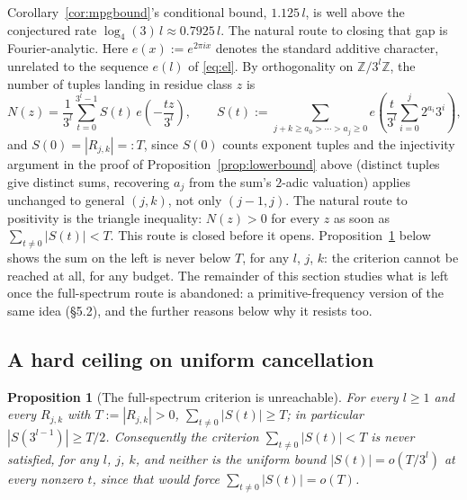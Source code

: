 \documentclass[11pt]{amsart}
\theoremstyle{plain}
\newtheorem{proposition}[theorem]{Proposition}
\theoremstyle{definition}
\theoremstyle{remark}
\newcommand{\Z}{\mathbb{Z}}
\begin{document}
Corollary~\ref{cor:mpgbound}'s conditional bound, $1.125\,l$, is well above the conjectured rate
$\log_4(3)\,l \approx 0.7925\,l$. The natural route to closing that gap is Fourier-analytic. Here
$e(x):=e^{2\pi ix}$ denotes the standard additive character, unrelated to the sequence $e(l)$ of
\eqref{eq:el}. By orthogonality on $\Z/3^l\Z$, the number of tuples landing in
residue class $z$ is
\begin{equation}
\label{eq:Nz}
N(z) = \frac1{3^l}\sum_{t=0}^{3^l-1} S(t)\,e\!\left(-\frac{tz}{3^l}\right), \qquad
S(t) := \sum_{j+k\ge a_0>\cdots>a_j\ge0} e\!\left(\frac{t}{3^l}\sum_{i=0}^j 2^{a_i}3^i\right),
\end{equation}
and $S(0)=|R_{j,k}|=:T$, since $S(0)$ counts exponent tuples and the injectivity argument in the
proof of Proposition~\ref{prop:lowerbound} above (distinct tuples give distinct sums, recovering
$a_j$ from the sum's $2$-adic valuation) applies unchanged to general $(j,k)$, not only $(j-1,j)$.
The natural route to positivity is the triangle inequality: $N(z)>0$ for
every $z$ as soon as $\sum_{t\ne0}|S(t)| < T$. This route is closed before it opens.
Proposition~\ref{prop:sqrtceiling} below shows the sum on the left is never below $T$, for any
$l$, $j$, $k$: the criterion cannot be reached at all, for any budget. The remainder
of this section studies what is left once the full-spectrum route is abandoned: a primitive-frequency
version of the same idea (\S5.2), and the further reasons below why it resists too.

\subsection{A hard ceiling on uniform cancellation}

\begin{proposition}[The full-spectrum criterion is unreachable]
\label{prop:sqrtceiling}
For every $l\ge1$ and every $R_{j,k}$ with $T:=|R_{j,k}|>0$, $\sum_{t\ne0}|S(t)| \ge T$; in
particular $|S(3^{l-1})|\ge T/2$. Consequently the criterion $\sum_{t\ne0}|S(t)|<T$ is never
satisfied, for any $l$, $j$, $k$, and neither is the uniform bound $|S(t)|=o(T/3^l)$ at every
nonzero $t$, since that would force $\sum_{t\ne0}|S(t)|=o(T)$.
\end{proposition}
\end{document}
